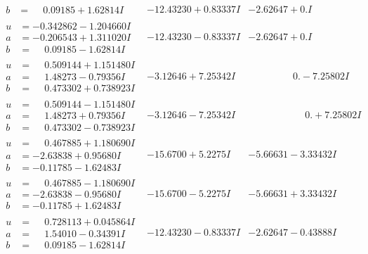 \documentclass[1p]{elsarticle_modified}
\theoremstyle{definition}
\begin{document}
$$\begin{array}{c|c|c}
\begin{aligned}
b &= \phantom{-}0.09185 + 1.62814 I\end{aligned}
 & -12.43230 + 0.83337 I & -2.62647 + 0. I\phantom{ +0.000000I} \\ \hline\begin{aligned}
u &= -0.342862 - 1.204660 I \\
a &= -0.206543 + 1.311020 I \\
b &= \phantom{-}0.09185 - 1.62814 I\end{aligned}
 & -12.43230 - 0.83337 I & -2.62647 + 0. I\phantom{ +0.000000I} \\ \hline\begin{aligned}
u &= \phantom{-}0.509144 + 1.151480 I \\
a &= \phantom{-}1.48273 - 0.79356 I \\
b &= \phantom{-}0.473302 + 0.738923 I\end{aligned}
 & -3.12646 + 7.25342 I & \phantom{-0.000000 } 0. - 7.25802 I \\ \hline\begin{aligned}
u &= \phantom{-}0.509144 - 1.151480 I \\
a &= \phantom{-}1.48273 + 0.79356 I \\
b &= \phantom{-}0.473302 - 0.738923 I\end{aligned}
 & -3.12646 - 7.25342 I & \phantom{-0.000000 -}0. + 7.25802 I \\ \hline\begin{aligned}
u &= \phantom{-}0.467885 + 1.180690 I \\
a &= -2.63838 + 0.95680 I \\
b &= -0.11785 - 1.62483 I\end{aligned}
 & -15.6700 + 5.2275 I & -5.66631 - 3.33432 I \\ \hline\begin{aligned}
u &= \phantom{-}0.467885 - 1.180690 I \\
a &= -2.63838 - 0.95680 I \\
b &= -0.11785 + 1.62483 I\end{aligned}
 & -15.6700 - 5.2275 I & -5.66631 + 3.33432 I \\ \hline\begin{aligned}
u &= \phantom{-}0.728113 + 0.045864 I \\
a &= \phantom{-}1.54010 - 0.34391 I \\
b &= \phantom{-}0.09185 - 1.62814 I\end{aligned}
 & -12.43230 - 0.83337 I & -2.62647 - 0.43888 I \\ \hline\begin{aligned}

\end{aligned}
\end{array}$$
\end{document}
